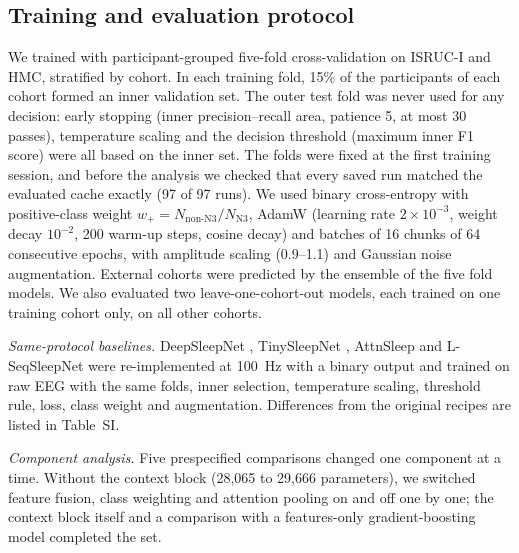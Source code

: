 \subsection{Training and evaluation protocol}
We trained with participant-grouped five-fold cross-validation on ISRUC-I and HMC, stratified by cohort. In each training fold, 15\% of the participants of each cohort formed an inner validation set. The outer test fold was never used for any decision: early stopping (inner precision--recall area, patience 5, at most 30 passes), temperature scaling \cite{guo2017calibration} and the decision threshold (maximum inner F1 score) were all based on the inner set. The folds were fixed at the first training session, and before the analysis we checked that every saved run matched the evaluated cache exactly (97 of 97 runs). %
We used binary cross-entropy with positive-class weight $w_+ = N_{\text{non-N3}}/N_{\text{N3}}$, AdamW (learning rate $2\times10^{-3}$, weight decay $10^{-2}$, 200 warm-up steps, cosine decay) and batches of 16 chunks of 64 consecutive epochs, with amplitude scaling (0.9--1.1) and Gaussian noise augmentation. External cohorts were predicted by the ensemble of the five fold models. We also evaluated two leave-one-cohort-out models, each trained on one training cohort only, on all other cohorts.

\textit{Same-protocol baselines.} DeepSleepNet \cite{supratak2017deepsleepnet}, TinySleepNet \cite{supratak2020tinysleepnet}, AttnSleep \cite{eldele2021attnsleep} and L-SeqSleepNet \cite{phan2023lseqsleepnet} were re-implemented at 100~Hz with a binary output and trained on raw EEG with the same folds, inner selection, temperature scaling, threshold rule, loss, class weight and augmentation. Differences from the original recipes are listed in Table~SI.

\textit{Component analysis.} Five prespecified comparisons changed one component at a time. Without the context block (28,065 to 29,666 parameters), we switched feature fusion, class weighting and attention pooling on and off one by one; the context block itself and a comparison with a features-only gradient-boosting model completed the set.

